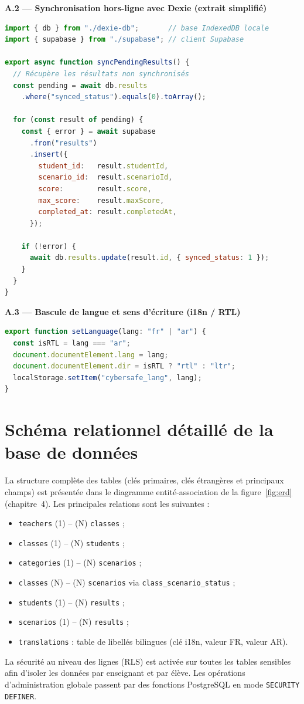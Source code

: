 \documentclass[12pt, a4paper, oneside]{report}
\begin{document}
\textbf{A.2 — Synchronisation hors-ligne avec Dexie (extrait simplifié)}
\begin{lstlisting}[language=JavaScript, caption={Pousse les résultats en attente vers Supabase à la reconnexion}]
import { db } from "./dexie-db";       // base IndexedDB locale
import { supabase } from "./supabase"; // client Supabase

export async function syncPendingResults() {
  // Récupère les résultats non synchronisés
  const pending = await db.results
    .where("synced_status").equals(0).toArray();

  for (const result of pending) {
    const { error } = await supabase
      .from("results")
      .insert({
        student_id:   result.studentId,
        scenario_id:  result.scenarioId,
        score:        result.score,
        max_score:    result.maxScore,
        completed_at: result.completedAt,
      });

    if (!error) {
      await db.results.update(result.id, { synced_status: 1 });
    }
  }
}
\end{lstlisting}

\textbf{A.3 — Bascule de langue et sens d'écriture (i18n / RTL)}
\begin{lstlisting}[language=JavaScript, caption={Application de la direction RTL lors du passage à l'arabe}]
export function setLanguage(lang: "fr" | "ar") {
  const isRTL = lang === "ar";
  document.documentElement.lang = lang;
  document.documentElement.dir = isRTL ? "rtl" : "ltr";
  localStorage.setItem("cybersafe_lang", lang);
}
\end{lstlisting}

\chapter{Schéma relationnel détaillé de la base de données}
La structure complète des tables (clés primaires, clés étrangères et principaux champs) est présentée dans le diagramme entité-association de la figure~\ref{fig:erd} (chapitre~4). Les principales relations sont les suivantes :
\begin{itemize}[leftmargin=*]
  \item \texttt{teachers} (1) -- (N) \texttt{classes} ;
  \item \texttt{classes} (1) -- (N) \texttt{students} ;
  \item \texttt{categories} (1) -- (N) \texttt{scenarios} ;
  \item \texttt{classes} (N) -- (N) \texttt{scenarios} via \texttt{class\_scenario\_status} ;
  \item \texttt{students} (1) -- (N) \texttt{results} ;
  \item \texttt{scenarios} (1) -- (N) \texttt{results} ;
  \item \texttt{translations} : table de libellés bilingues (clé i18n, valeur FR, valeur AR).
\end{itemize}
La sécurité au niveau des lignes (RLS) est activée sur toutes les tables sensibles afin d'isoler les données par enseignant et par élève. Les opérations d'administration globale passent par des fonctions PostgreSQL en mode \texttt{SECURITY DEFINER}.
\end{document}
